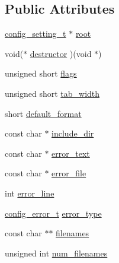 \subsection*{Public Attributes}
\begin{DoxyCompactItemize}
\item 
\hyperlink{structconfig__setting__t}{config\_\-setting\_\-t} $\ast$ \hyperlink{structconfig__t_a32f9518ccc7f8a65b5f794fc9d38a565}{root}
\item 
void($\ast$ \hyperlink{structconfig__t_a2d05a50f18015afcd6b4b2a1a97e678c}{destructor} )(void $\ast$)
\item 
unsigned short \hyperlink{structconfig__t_a3c9f48dc1434aa2129fa00c0a4161128}{flags}
\item 
unsigned short \hyperlink{structconfig__t_aaa1a237aeadf1111eaac6946b252c227}{tab\_\-width}
\item 
short \hyperlink{structconfig__t_aef80ce4b7772667e6615a19633ce0a65}{default\_\-format}
\item 
const char $\ast$ \hyperlink{structconfig__t_a4cfbc200fe5186e02b39a81d6d9171fc}{include\_\-dir}
\item 
const char $\ast$ \hyperlink{structconfig__t_ab1af593275e4d341c8cc455a9e84588d}{error\_\-text}
\item 
const char $\ast$ \hyperlink{structconfig__t_a244b41324f8458377c6aff4c5caa966f}{error\_\-file}
\item 
int \hyperlink{structconfig__t_a4c437bd0d5063aaf27f68cb84bba8616}{error\_\-line}
\item 
\hyperlink{libconfig_8h_aa2ee0cc0ed9667955b6c3e93b8577339}{config\_\-error\_\-t} \hyperlink{structconfig__t_a4619b7a4a2d2259e90137426a4263dbe}{error\_\-type}
\item 
const char $\ast$$\ast$ \hyperlink{structconfig__t_a208403fa69f842cb29b8055a0ccb8317}{filenames}
\item 
unsigned int \hyperlink{structconfig__t_ac0ac2e11cba896d1a365aa680125e641}{num\_\-filenames}
\end{DoxyCompactItemize}


